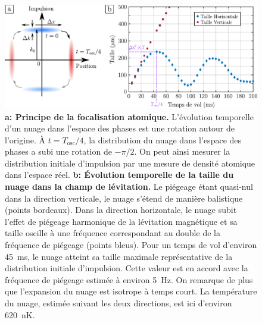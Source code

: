 \begin{figure}
\centering
\includegraphics[width=\textwidth]{Fig/Anex/focalisation_atomique.pdf}
\caption{\textbf{a: Principe de la focalisation atomique.} L'évolution temporelle d'un nuage dans l'espace des phases est une rotation autour de l'origine. À $t=T_{\mathrm{osc}}/4$, la distribution du nuage dans l'espace des phases a subi une rotation de $-\pi/2$. On peut ainsi mesurer la distribution initiale d'impulsion par une mesure de densité atomique dans l'espace réel. \textbf{b: Évolution temporelle de la taille du nuage dans la champ de lévitation.} Le piégeage étant quasi-nul dans la direction verticale, le nuage s'étend de manière balistique (points bordeaux). Dans la direction horizontale, le nuage subit l'effet de piégeage harmonique de la lévitation magnétique et sa taille oscille à une fréquence correspondant au double de la fréquence de piégeage (points bleus). Pour un temps de vol d'environ \SI{45}{\milli\second}, le nuage atteint sa taille maximale représentative de la distribution initiale d'impulsion. Cette valeur est en accord avec la fréquence de piégeage estimée à environ \SI{5}{\hertz}. On remarque de plus que l'expansion du nuage est isotrope à temps court. La température du nuage, estimée suivant les deux directions, est ici d'environ \SI{620}{\nano\kelvin}.}
\label{fig:focalisation_atomique}
\end{figure}




